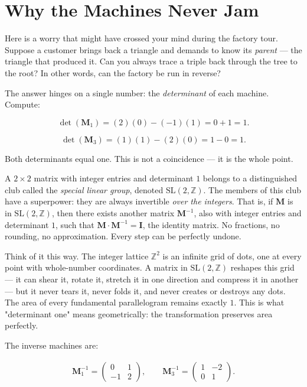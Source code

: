 \documentclass[11pt,twoside,openright]{book}
\theoremstyle{definition}
\theoremstyle{remark}
\begin{document}
\section{Why the Machines Never Jam}

Here is a worry that might have crossed your mind during the factory tour. Suppose a customer brings back a triangle and demands to know its \textit{parent} --- the triangle that produced it. Can you always trace a triple back through the tree to the root? In other words, can the factory be run in reverse?

The answer hinges on a single number: the \textit{determinant} of each machine. Compute:

\[\det(\mathbf{M}_1) = (2)(0) - (-1)(1) = 0 + 1 = 1.\]

\[\det(\mathbf{M}_3) = (1)(1) - (2)(0) = 1 - 0 = 1.\]

Both determinants equal one. This is not a coincidence --- it is the whole point.

A $2 \times 2$ matrix with integer entries and determinant $1$ belongs to a distinguished club called the \textit{special linear group}, denoted $\mathrm{SL}(2, \mathbb{Z})$. The members of this club have a superpower: they are always invertible \textit{over the integers}. That is, if $\mathbf{M}$ is in $\mathrm{SL}(2, \mathbb{Z})$, then there exists another matrix $\mathbf{M}^{-1}$, also with integer entries and determinant $1$, such that $\mathbf{M} \cdot \mathbf{M}^{-1} = \mathbf{I}$, the identity matrix. No fractions, no rounding, no approximation. Every step can be perfectly undone.

Think of it this way. The integer lattice $\mathbb{Z}^2$ is an infinite grid of dots, one at every point with whole-number coordinates. A matrix in $\mathrm{SL}(2, \mathbb{Z})$ reshapes this grid --- it can shear it, rotate it, stretch it in one direction and compress it in another --- but it never tears it, never folds it, and never creates or destroys any dots. The area of every fundamental parallelogram remains exactly $1$. This is what "determinant one" means geometrically: the transformation preserves area perfectly.

The inverse machines are:

\begin{align*}
\mathbf{M}_1^{-1} = \begin{pmatrix} 0 & 1 \\ -1 & 2 \end{pmatrix}, \qquad
\mathbf{M}_3^{-1} = \begin{pmatrix} 1 & -2 \\ 0 & 1 \end{pmatrix}.
\end{align*}
\end{document}

